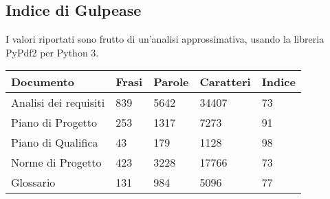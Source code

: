 \documentclass[a4paper, 12pt]{article}
\begin{document}
\subsection{Indice di Gulpease}
I valori riportati sono frutto di un'analisi approssimativa, usando la libreria PyPdf2 per Python 3.
\begin{center}
	\begin{tabularx}{\textwidth}{|X|X|X|X|X|}
		\hline
		\textbf{Documento} & \textbf{Frasi } & \textbf{Parole } & \textbf{Caratteri } & \textbf{Indice }\\
		\hline
		Analisi dei requisiti &  839                   & 5642 & 34407 & 73                       \\
		\hline
		Piano di Progetto    & 253                     & 1317       & 7273 & 91             \\
		\hline
		Piano di Qualifica    & 43                     & 179       & 1128 &   98             \\
		\hline
		Norme di Progetto    & 423                     & 3228       & 17766 &  73              \\
		\hline
		Glossario    & 131                     		& 984 		& 5096 &    77            \\
		\hline
	\end{tabularx}\\[8pt]
	\mbox{}\\
\end{center}
\end{document}
